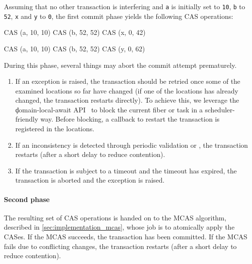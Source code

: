 Assuming that no other transaction is interfering and \texttt{a} is initially set to \texttt{10}, \texttt{b} to \texttt{52}, \texttt{x} and \texttt{y} to \texttt{0}, the first commit phase yields the following CAS operations:

\smallskip
\begin{minipage}[t]{.45\textwidth}
\begin{ocamlcode}
CAS (a, 10, 10)
CAS (b, 52, 52)
CAS (x, 0, 42)
\end{ocamlcode}
\end{minipage}
\hfill
\begin{minipage}[t]{.45\textwidth}
\begin{ocamlcode}
CAS (a, 10, 10)
CAS (b, 52, 52)
CAS (y, 0, 62)
\end{ocamlcode}
\end{minipage}
\smallskip

During this phase, several things may abort the commit attempt prematurely.
\begin{enumerate}
  \item
    If an  exception is raised, the transaction should be retried once some of the examined locations so far have changed (if one of the locations has already changed, the transaction restarts directly).
    To achieve this, we leverage the \c{domain-local-await} API~\citep{domain-local-await} to block the current fiber or task in a scheduler-friendly way.
    Before blocking, a callback to restart the transaction is registered in the locations.
  \item
    If an inconsistency is detected through periodic validation or , the transaction restarts (after a short delay to reduce contention).
  \item
    If the transaction is subject to a timeout and the timeout has expired, the transaction is aborted and the  exception is raised.
\end{enumerate}

\paragraph{Second phase}

The resulting set of CAS operations is handed on to the MCAS algorithm, described in \cref{sec:implementation_mcas}, whose job is to atomically apply the CASes.
If the MCAS succeeds, the transaction has been committed.
If the MCAS fails due to conflicting changes, the transaction restarts (after a short delay to reduce contention).


